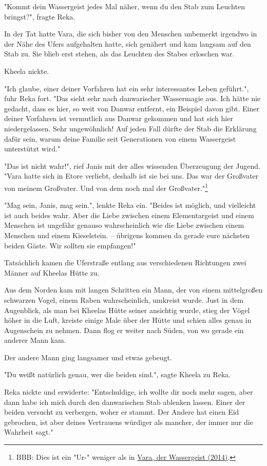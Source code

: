\documentclass[10pt, a4paper, oneside]{book}
\newcommand{\refstorytext}[1]{\hyperref[Storytext: #1]{#1}}
\begin{document}
\begin{multicols}{2}
"Kommt dein Wassergeist jedes Mal näher, wenn du den Stab zum Leuchten bringst?", fragte Reka. 

In der Tat hatte Vara, die sich bisher von den Menschen unbemerkt irgendwo in der Nähe des Ufers aufgehalten hatte, sich genähert und kam langsam auf den Stab zu. Sie blieb erst stehen, als das Leuchten des Stabes erloschen war. 

Kheela nickte. 

"Ich glaube, einer deiner Vorfahren hat ein sehr interessantes Leben geführt.", fuhr Reka fort. "Das sieht sehr nach danwarischer Wassermagie aus. Ich hätte nie gedacht, dass es hier, so weit von Danwar entfernt, ein Beispiel davon gibt. Einer deiner Vorfahren ist vermutlich aus Danwar gekommen und hat sich hier niedergelassen. Sehr ungewöhnlich! Auf jeden Fall dürfte der Stab die Erklärung dafür sein, warum deine Familie seit Generationen von einem Wassergeist unterstützt wird." 

"Das ist nicht wahr!", rief Janis mit der alles wissenden Überzeugung der Jugend. "Vara hatte sich in Etore verliebt, deshalb ist sie bei uns. Das war der Großvater von meinem Großvater. Und von dem noch mal der Großvater."\footnote{BBB: Dies ist ein "Ur-" weniger als in \refstorytext{Vara, der Wassergeist (2014)}.} 

"Mag sein, Janis, mag sein.", lenkte Reka ein. "Beides ist möglich, und vielleicht ist auch beides wahr. Aber die Liebe zwischen einem Elementargeist und einem Menschen ist ungefähr genauso wahrscheinlich wie die Liebe zwischen einem Menschen und einem Kieselstein. – übrigens kommen da gerade eure nächsten beiden Gäste. Wir sollten sie empfangen!" 

Tatsächlich kamen die Uferstraße entlang aus verschiedenen Richtungen zwei Männer auf Kheelas Hütte zu. 

Aus dem Norden kam mit langen Schritten ein Mann, der von einem mittelgroßen schwarzen Vogel, einem Raben wahrscheinlich, umkreist wurde. Just in dem Augenblick, als man bei Kheelas Hütte seiner ansichtig wurde, stieg der Vögel höher in die Luft, kreiste einige Male über der Hütte und schien alles genau in Augenschein zu nehmen. Dann flog er weiter nach Süden, von wo gerade ein anderer Mann kam. 

Der andere Mann ging langsamer und etwas gebeugt.

"Du weißt natürlich genau, wer die beiden sind.", sagte Kheela zu Reka.

Reka nickte und erwiderte: "Entschuldige, ich wollte dir noch mehr sagen, aber 
dann habe ich mich durch den danwarischen Stab ablenken lassen. Einer der beiden versucht zu verbergen, woher er stammt. Der Andere hat einen Eid gebrochen, ist aber deines Vertrauens würdiger als mancher, der immer nur die Wahrheit sagt." 


\end{multicols}
\end{document}
